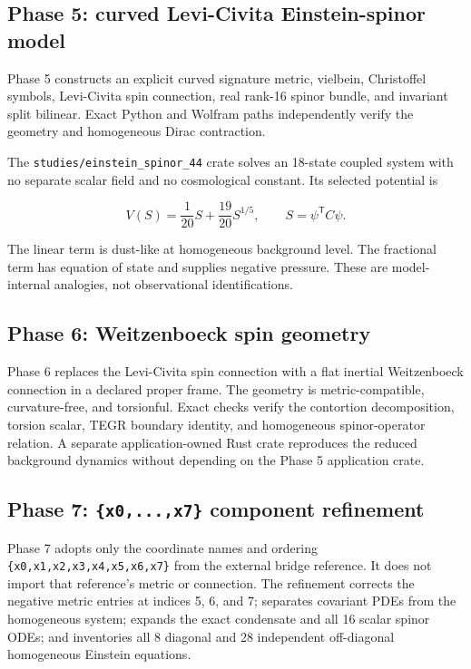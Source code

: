 \documentclass[11pt]{article}
\begin{document}
\subsection{Phase 5: curved Levi-Civita Einstein-spinor model}

Phase 5 constructs an explicit curved signature \texttt{} metric, vielbein, Christoffel symbols, Levi-Civita spin connection, real rank-16 spinor bundle, and invariant split bilinear. Exact Python and Wolfram paths independently verify the geometry and homogeneous Dirac contraction.

The \texttt{studies/\allowbreak{}einstein\allowbreak{}\_spinor\_\allowbreak{}44} crate solves an 18-state coupled system with no separate scalar field and no cosmological constant. Its selected potential is

\[
V(S)=\frac1{20}S+\frac{19}{20}S^{1/5},
\qquad S=\psi^{\mathsf T}C\psi.
\]

The linear term is dust-like at homogeneous background level. The fractional term has equation of state \texttt{} and supplies negative pressure. These are model-internal analogies, not observational identifications.

\subsection{Phase 6: Weitzenboeck spin geometry}

Phase 6 replaces the Levi-Civita spin connection with a flat inertial Weitzenboeck connection in a declared proper frame. The geometry is metric-compatible, curvature-free, and torsionful. Exact checks verify the contortion decomposition, torsion scalar, TEGR boundary identity, and homogeneous spinor-operator relation. A separate application-owned Rust crate reproduces the reduced background dynamics without depending on the Phase 5 application crate.

\subsection{Phase 7: \texttt{\{x0,...,\allowbreak{}x7\}} component refinement}

Phase 7 adopts only the coordinate names and ordering \texttt{\{x0,x1,x\allowbreak{}2,x3,x4,\allowbreak{}x5,x6,x7\allowbreak{}\}} from the external bridge reference. It does not import that reference's metric or connection. The refinement corrects the negative metric entries at indices 5, 6, and 7; separates covariant PDEs from the homogeneous system; expands the exact condensate and all 16 scalar spinor ODEs; and inventories all 8 diagonal and 28 independent off-diagonal homogeneous Einstein equations.
\end{document}
